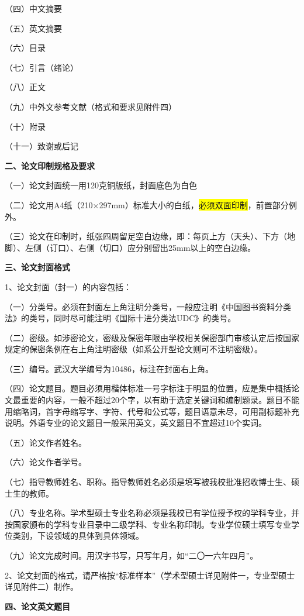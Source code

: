 \documentclass{WHUMaster}   %
\begin{document}
（四）中文摘要

（五）英文摘要

（六）目录

（七）引言（绪论）

（八）正文

（九）中外文参考文献（格式和要求见附件四）

（十）附录

（十一）致谢或后记

\textbf{二、论文印制规格及要求}

（一）论文封面统一用120克铜版纸，封面底色为白色

（二）论文用A4纸（210×297mm）标准大小的白纸，\colorbox{yellow}{必须双面印制}，前置部分例外。

（三）论文在印制时，纸张四周留足空白边缘，即：每页上方（天头）、下方（地脚）、左侧（订口）、右侧（切口）应分别留出25mm以上的空白边缘。

\textbf{三、论文封面格式}

1、论文封面（封一）的内容包括：

（一）分类号。必须在封面左上角注明分类号，一般应注明《中国图书资料分类法》的类号，同时尽可能注明《国际十进分类法UDC》的类号。

（二）密级。如涉密论文，密级及保密年限由学校相关保密部门审核认定后按国家规定的保密条例在右上角注明密级（如系公开型论文则可不注明密级）。

（三）编号。武汉大学编号为10486，标注在封面右上角。

（四）论文题目。题目必须用楷体标准一号字标注于明显的位置，应是集中概括论文最重要的内容，一般不超过20个字，以有助于选定关键词和编制题录。题目不能用缩略词，首字母缩写字、字符、代号和公式等，题目语意未尽，可用副标题补充说明。外语专业的论文题目一般采用英文，英文题目不宜超过10个实词。

（五）论文作者姓名。

（六）论文作者学号。

（七）指导教师姓名、职称。指导教师姓名必须是填写被我校批准招收博士生、硕士生的教师。

（八）专业名称。学术型硕士专业名称必须是我校已有学位授予权的学科专业，并按国家颁布的学科专业目录中二级学科、专业名称印制。专业学位硕士填写专业学位类别，下设领域的具体到具体领域。

（九）论文完成时间。用汉字书写，只写年月，如“二〇一六年四月”。

2、论文封面的格式，请严格按“标准样本”（学术型硕士详见附件一，专业型硕士详见附件二）制作。

\textbf{四、论文英文题目}
\end{document}
